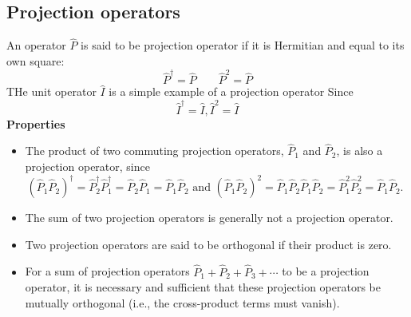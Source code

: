 \subsection{Projection operators}
An operator $\hat{P}$ is said to be projection operator if it is Hermitian and equal to its own square:\\
$$\hat{P}^{\dagger}=\hat{P} \quad \quad \hat{P}^2=\hat{P}$$
THe unit operator $\hat{I}$ is a simple example of a projection operator Since $$\hat{I}^{\dagger}=\hat{I}, \hat{I}^2=\hat{I}$$
\textbf{Properties}\\
\begin{itemize}
	\item The product of two commuting projection operators, $\hat{P}_{1}$ and $\hat{P}_{2}$, is also a projection operator, since
	$$
	\left(\hat{P}_{1} \hat{P}_{2}\right)^{\dagger}=\hat{P}_{2}^{\dagger} \hat{P}_{1}^{\dagger}=\hat{P}_{2} \hat{P}_{1}=\hat{P}_{1} \hat{P}_{2} \text { and }\left(\hat{P}_{1} \hat{P}_{2}\right)^{2}=\hat{P}_{1} \hat{P}_{2} \hat{P}_{1} \hat{P}_{2}=\hat{P}_{1}^{2} \hat{P}_{2}^{2}=\hat{P}_{1} \hat{P}_{2} \text {. }
	$$
	\item  The sum of two projection operators is generally not a projection operator.
	\item  Two projection operators are said to be orthogonal if their product is zero.
	\item For a sum of projection operators $\hat{P}_{1}+\hat{P}_{2}+\hat{P}_{3}+\cdots$ to be a projection operator, it is necessary and sufficient that these projection operators be mutually orthogonal (i.e., the cross-product terms must vanish).
\end{itemize}

